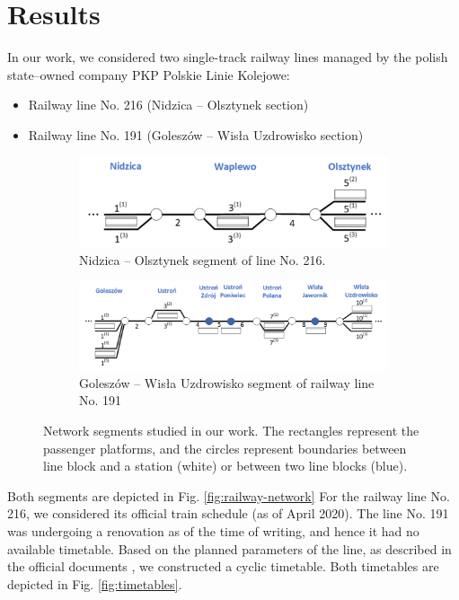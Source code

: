 \section{Results}
In our work, we considered two single-track railway lines managed by the polish state--owned
company PKP Polskie Linie Kolejowe:

\begin{itemize}
	\item Railway line No. 216 (Nidzica -- Olsztynek section)
	\item Railway line No. 191 (Goleszów -- Wisła Uzdrowisko section)
\end{itemize}


\begin{figure}
  \begin{subfigure}[a]{\textwidth}
    \includegraphics[width=\textwidth]{figures/line_small.pdf}
    \caption{ Nidzica -- Olsztynek segment of line No. 216.}
  \end{subfigure}
  \begin{subfigure}[b]{\textwidth}
    \includegraphics[width=\textwidth]{figures/line.pdf}
    \caption{Goleszów -- Wisła Uzdrowisko segment of railway line No. 191}
  \end{subfigure}
  \caption{
    Network segments studied in our work. The rectangles represent the passenger platforms,
    and the circles represent boundaries between line block and a station (white) or between
    two line blocks (blue).
  }
  \label{fig:railway-network2}
\end{figure}

Both segments are depicted in Fig. \ref{fig:railway-network}
For the railway line No. 216, we considered its official train schedule (as of April 2020). The
line No. 191 was undergoing a renovation as of the time of writing, and hence it had no
available timetable. Based on the planned parameters of the line, as described in the official
documents \cite{}, we constructed a cyclic timetable. Both timetables are depicted in Fig.
\ref{fig:timetables}.

